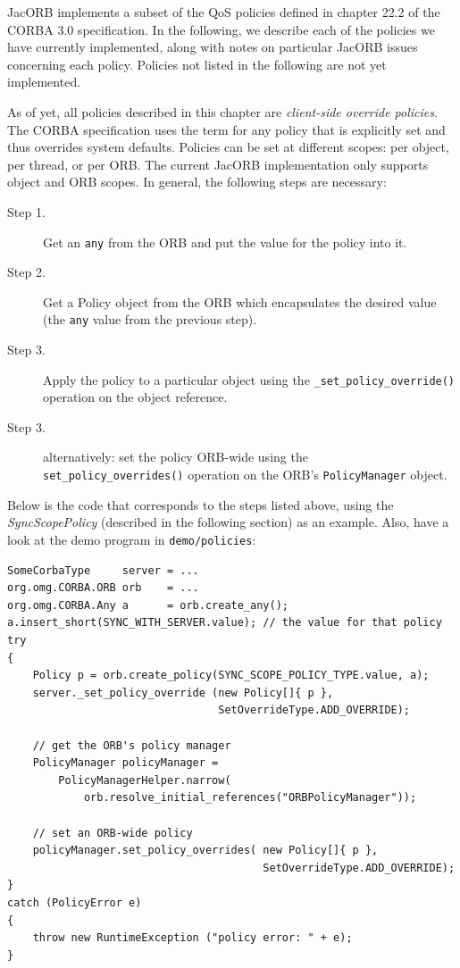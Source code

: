 
JacORB implements a subset of the QoS policies defined in chapter
22.2 of the CORBA 3.0 specification.  In the following, we describe
each of the policies we have currently implemented, along with notes
on particular JacORB issues concerning each policy.  Policies not
listed in the following are not yet implemented.

As of yet, all policies described in this chapter are
\emph{client-side override policies}. The CORBA specification uses the
term for any policy that is explicitly set and thus overrides system
defaults. Policies can be set at different scopes: per object, per
thread, or per ORB. The current JacORB implementation only supports
object and ORB scopes. In general, the following steps are necessary: 

\begin{description}
\item[Step 1.] Get an {\tt any} from the ORB and put the value for the
           policy into it.
\item[Step 2.] Get a Policy object from the ORB which encapsulates the
           desired value (the {\tt any} value from the previous step).
\item[Step 3.]  Apply the policy to a particular object using the 
           {\tt \_set\_policy\_override()} operation on the object
           reference. 
\item[Step 3.] alternatively: set the policy ORB-wide using the {\tt
           set\_policy\_overrides()} operation on the ORB's
           {\tt PolicyManager} object.
\end{description}

Below is the code that corresponds to the steps listed above, using the
\emph{SyncScopePolicy} (described in the following section) as an
example. Also, have a look at the demo program in {\tt demo/policies}:

\begin{verbatim}
SomeCorbaType     server = ...
org.omg.CORBA.ORB orb    = ...
org.omg.CORBA.Any a      = orb.create_any();
a.insert_short(SYNC_WITH_SERVER.value); // the value for that policy
try
{
    Policy p = orb.create_policy(SYNC_SCOPE_POLICY_TYPE.value, a);
    server._set_policy_override (new Policy[]{ p },
                                 SetOverrideType.ADD_OVERRIDE);
    
    // get the ORB's policy manager
    PolicyManager policyManager = 
        PolicyManagerHelper.narrow( 
            orb.resolve_initial_references("ORBPolicyManager"));
    
    // set an ORB-wide policy
    policyManager.set_policy_overrides( new Policy[]{ p }, 
                                        SetOverrideType.ADD_OVERRIDE);
}
catch (PolicyError e)
{
    throw new RuntimeException ("policy error: " + e);
}
\end{verbatim}

